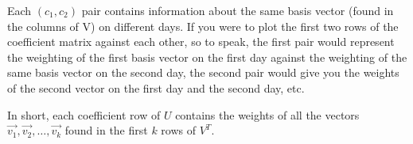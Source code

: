 \documentclass{article}
\begin{document}
Each $(c_{1},c_{2})$ pair contains information about the same basis
vector (found in the columns of V) on different days.  If you were to
plot the first two rows of the coefficient matrix against each other,
so to speak, the first pair would represent the weighting of the first
basis vector on the first day against the weighting of the same basis
vector on the second day, the second pair would give you the weights
of the second vector on the first day and the second day, etc.

In short, each coefficient row of $U$ contains the weights of all the
vectors $\vec{v_{1}}, \vec{v_{2}},\ldots,\vec{v_{k}}$ found in the
first $k$ rows of $V^{T}$.
\end{document}
